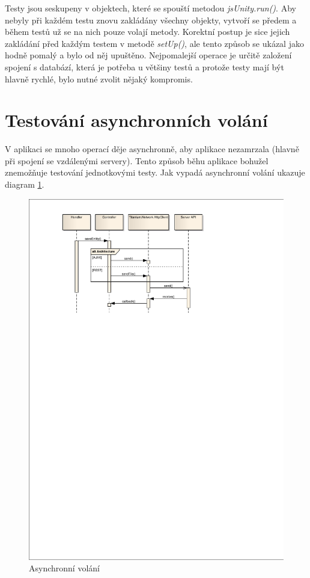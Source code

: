 Testy jsou seskupeny v objektech, které se spouští metodou \emph{jsUnity.run()}. Aby nebyly při každém testu znovu zakládány všechny objekty, vytvoří se předem a během testů už se na nich pouze volají metody. Korektní postup je sice jejich zakládání před každým testem v metodě \emph{setUp()}, ale tento způsob se ukázal jako hodně pomalý a bylo od něj upuštěno. Nejpomalejší operace je určitě založení spojení s databází, která je potřeba u většiny testů a protože testy mají být hlavně rychlé, bylo nutné zvolit nějaký kompromis.

\section{Testování asynchronních volání}

V aplikaci se mnoho operací děje asynchronně, aby aplikace nezamrzala (hlavně při spojení se vzdálenými servery). Tento způsob běhu aplikace bohužel znemožňuje testování jednotkovými testy. Jak vypadá asynchronní volání ukazuje diagram \ref{fig:async-tests}.

\begin{figure}[h]
\begin{center}
	\includegraphics[width=15cm,trim=10mm 205mm 40mm 10mm, clip]{figures/async-tests}
	\caption{Asynchronní volání}
	\label{fig:async-tests}
\end{center}
\end{figure}

